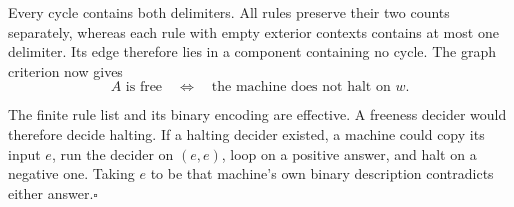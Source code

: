 \documentclass[11pt,a4paper]{article}
\begin{document}
Every cycle contains both delimiters. All rules preserve their two counts separately, whereas
each rule with empty exterior contexts contains at most one delimiter. Its edge therefore lies in
a component containing no cycle. The graph criterion now gives
\[
  A\text{ is free}\quad\iff\quad\text{the machine does not halt on $w$.}
\]

The finite rule list and its binary encoding are effective. A freeness decider would therefore
decide halting. If a halting decider existed, a machine could copy its input $e$, run the decider
on $(e,e)$, loop on a positive answer, and halt on a negative one. Taking $e$ to be that machine's
own binary description contradicts either answer.\hfill$\square$
\end{document}
